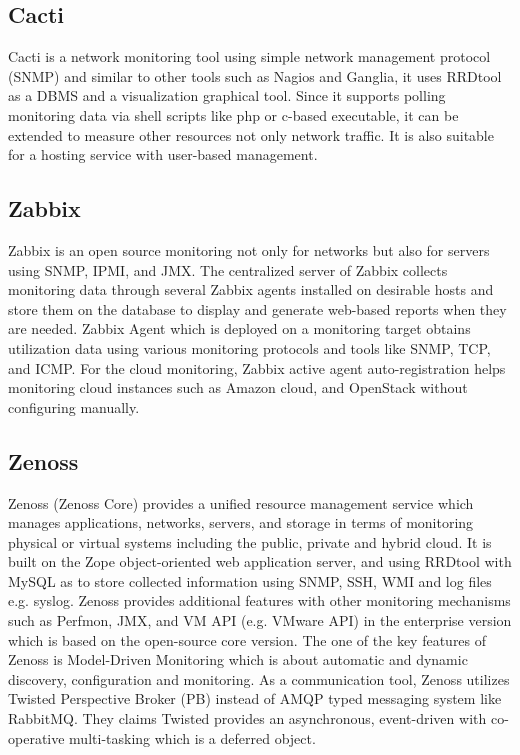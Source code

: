 \documentclass{sig-alternate}
\begin{document}
\subsection{Cacti}
Cacti is a network monitoring tool using simple network management protocol (SNMP) and similar to other tools such as Nagios and Ganglia, it uses RRDtool as a DBMS and a visualization graphical tool. Since it supports polling monitoring data via shell scripts like php or c-based executable, it can be extended to measure other resources not only network traffic. It is also suitable for a hosting service with user-based management.

\subsection{Zabbix}

Zabbix is an open source monitoring not only for networks but also for servers using SNMP, IPMI, and JMX. The centralized server of Zabbix collects monitoring data through several Zabbix agents installed on desirable hosts and store them on the database to display and generate web-based reports when they are needed. Zabbix Agent which is deployed on a monitoring target obtains utilization data using various monitoring protocols and tools like SNMP, TCP, and ICMP. For the cloud monitoring, Zabbix active agent auto-registration helps monitoring cloud instances such as Amazon cloud, and OpenStack without configuring manually.

\subsection{Zenoss}

Zenoss (Zenoss Core) provides a unified resource management service which manages applications, networks, servers, and storage in terms of monitoring physical or virtual systems including the public, private and hybrid cloud. It is built on the Zope object-oriented web application server, and using RRDtool with MySQL as to store collected information using SNMP, SSH, WMI and log files e.g. syslog. Zenoss provides additional features with other monitoring mechanisms such as Perfmon, JMX, and VM API (e.g. VMware API) in the enterprise version which is based on the open-source core version. The one of the key features of Zenoss is Model-Driven Monitoring which is about automatic and dynamic discovery, configuration and monitoring. As a communication tool, Zenoss utilizes Twisted Perspective Broker (PB) instead of AMQP typed messaging system like RabbitMQ. They claims Twisted provides an asynchronous, event-driven with co-operative multi-tasking which is a deferred object.
\end{document}

